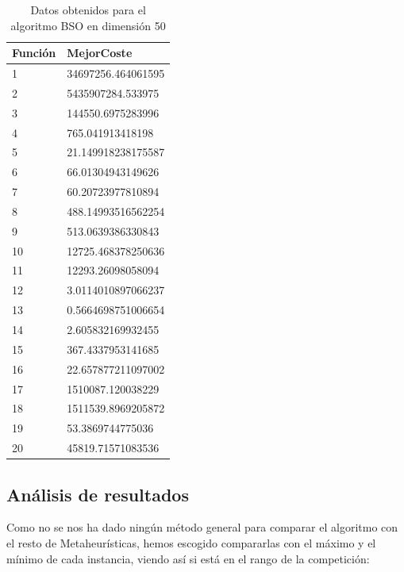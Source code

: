 \begin{table}[htbp]
	\begin{center}
		\begin{tabular}{|l|l|}
			\hline
			Función & MejorCoste \\
			\hline \hline
			1& 34697256.464061595 \\ \hline
			2& 5435907284.533975 \\ \hline
			3& 144550.6975283996 \\ \hline
			4& 765.041913418198 \\ \hline
			5& 21.149918238175587 \\ \hline
			6& 66.01304943149626 \\ \hline
			7& 60.20723977810894 \\ \hline
			8& 488.14993516562254 \\ \hline
			9& 513.0639386330843 \\ \hline
			10& 12725.468378250636 \\ \hline
			11& 12293.26098058094 \\ \hline
			12 & 3.0114010897066237 \\ \hline
			13 & 0.5664698751006654 \\ \hline
			14 & 2.605832169932455 \\ \hline
			15 & 367.4337953141685 \\ \hline
			16 & 22.657877211097002 \\ \hline
			17 & 1510087.120038229 \\ \hline
			18 & 1511539.8969205872 \\ \hline
			19 & 53.3869744775036 \\ \hline
			20 & 45819.71571083536 \\ \hline

		\end{tabular}
		\caption{Datos obtenidos para el algoritmo BSO en dimensión 50}
		\label{tabla:Dimension50}
	\end{center}
\end{table}


\newpage

\subsection{Análisis de resultados}

Como no se nos ha dado ningún método general para comparar el algoritmo con el resto de Metaheurísticas, hemos escogido compararlas con el máximo y el mínimo de cada instancia, viendo así si está en el rango de la competición:\\

